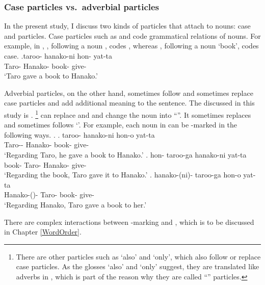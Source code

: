 \subsubsection{Case particles vs.~adverbial particles}

In the present study,
I discuss two kinds of particles that attach to nouns:
case and  particles.
Case particles such as  and 
code grammatical relations of nouns.
For example, in \Next,
, following a noun , codes ,
whereas , following a noun  `book', codes  case.
%
\exg.\label{ExShibatani90257}taroo- hanako-ni hon- yat-ta \\
        Taro- Hanako- book- give- \\
        `Taro gave a book to Hanako.'
  \hfill{\cite[257]{shibatani90}}


Adverbial particles, on the other hand,
sometimes follow and sometimes replace case particles
and add additional meaning to the sentence.
The  discussed in this study is .%
 \footnote{
 There are other  particles such as  `also' and  `only',
 which also follow or replace case particles.
 As the glosses `also' and `only' suggest,
 they are translated like adverbs in ,
 which is part of the reason why they are called ``'' particles.
 }
 can replace  and  and change the noun into ``''.
It sometimes replaces and sometimes follows  `'.
For example,
each noun in \Last can be -marked in the following ways.
%
\ex. \ag. taroo- hanako-ni hon-o yat-ta \\
        Taro-- Hanako- book- give- \\
        `Regarding Taro, he gave a book to Hanako.'
 \bg. hon- taroo-{ga} hanako-ni yat-ta \\
      book- Taro- Hanako- give- \\
        `Regarding the book, Taro gave it to Hanako.'
 \bg. hanako-(ni)- taroo-{ga} hon-o yat-ta \\
      Hanako-()- Taro- book- give- \\
        `Regarding Hanako, Taro gave a book to her.'

There are complex interactions between -marking and  \cite[e.g.,][]{kuroda79},
which is to be discussed in Chapter \ref{WordOrder}.


